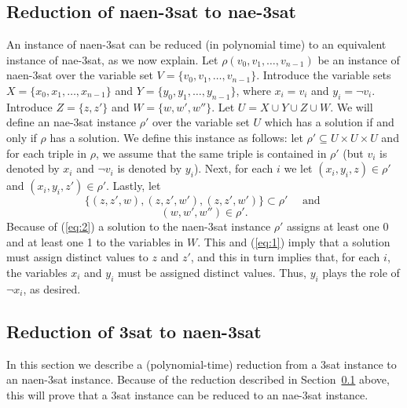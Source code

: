 \documentclass[12pt]{amsart}
\numberwithin{equation}{section}
\theoremstyle{plain}
\theoremstyle{definition}
\newcommand{\sat}{\acs{sat}\xspace}
\newcommand{\nae}{\acs{nae}\xspace}
\newcommand{\naen}{\acs{naen}\xspace}
\begin{document}
\subsection{Reduction of \naen-3\sat to \nae-3\sat}
\label{sec:reduction-naen-3sat}
An instance of \naen-3\sat can be reduced (in polynomial time) to an
equivalent instance of \nae-3\sat, as we now explain.  Let $\rho(v_0, v_1,
\dots, v_{n-1})$ be an instance of \naen-3\sat over the variable set
$V = \{v_0, v_1, \dots, v_{n-1}\}$.
Introduce the variable sets $X = \{x_0, x_1, \dots, x_{n-1}\}$ and 
$Y = \{y_0, y_1, \dots, y_{n-1}\}$, where $x_i = v_i$
and  $y_i = \neg v_i$.
Introduce $Z = \{z, z'\}$ and $W = \{w, w', w''\}$.
Let $U = X \cup Y \cup Z \cup W$. We will define
an \nae-3\sat instance $\rho'$ over the variable set $U$ which has a
solution if and only if $\rho$ has a solution.
We define this instance as follows: let $\rho' \subseteq U \times U \times U$
and for each triple in $\rho$, we assume that the same triple is contained in $\rho'$
(but $v_i$ is denoted by $x_i$ and $\neg v_i$ is denoted by $y_i$).
Next, for each $i$ we let $(x_i, y_i, z)\in \rho'$ and
$(x_i, y_i, z')\in \rho'$. Lastly, let
\begin{equation}
  \label{eq:1}
\{(z,z',w), (z,z',w'), (z,z',w')\} \subset \rho' \quad \text{ and }
\end{equation}
\begin{equation}
  \label{eq:2}
(w,w',w'')\in \rho'.
\end{equation}
Because of (\ref{eq:2})
a solution to
the \naen-3\sat instance $\rho'$ assigns at least one 0 and at least one 1
to the variables in $W$.
This and (\ref{eq:1}) imply that a solution must assign distinct
values to $z$ and $z'$, and this in turn implies that,
for each $i$, the variables $x_i$ and $y_i$
must be assigned distinct values.  Thus, $y_i$ plays the role of $\neg x_i$, as desired.

\subsection{Reduction of 3\sat to \naen-3\sat}
In this section we describe a (polynomial-time) reduction from a 3\sat instance
to an  \naen-3\sat instance.  Because of the reduction described in
Section~\ref{sec:reduction-naen-3sat} above, this will prove that 
a 3\sat instance can be reduced to an \nae-3\sat instance.
\end{document}
